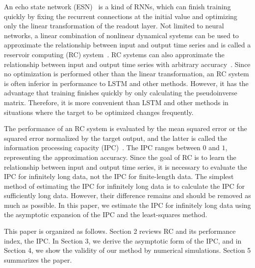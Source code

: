 \documentclass{article}
\begin{document}
An echo state network (ESN)~\cite{jaeger2004harnessing} is a kind of RNNs, which can finish training quickly by fixing the recurrent connections at the initial value and optimizing only the linear transformation of the readout layer. 
Not limited to neural networks, a linear combination of nonlinear dynamical systems can be used to approximate the relationship between input and output time series and is called a reservoir computing (RC) system~\cite{tanaka2019recent}. 
RC systems can also approximate the relationship between input and output time series with arbitrary accuracy~\cite{grigoryeva2018echo, gonon2019reservoir}. 
Since no optimization is performed other than the linear transformation, an RC system is often inferior in performance to LSTM and other methods. 
However, it has the advantage that training finishes quickly by only calculating the pseudoinverse matrix. 
Therefore, it is more convenient than LSTM and other methods in situations where the target to be optimized changes frequently. 

The performance of an RC system is evaluated by the mean squared error or the squared error normalized by the target output, and the latter is called the information processing capacity (IPC)~\cite{dambre2012information, kubota2021unifying}. 
The IPC ranges between $0$ and $1$, representing the approximation accuracy. 
Since the goal of RC is to learn the relationship between input and output time series, it is necessary to evaluate the IPC for infinitely long data, not the IPC for finite-length data. 
The simplest method of estimating the IPC for infinitely long data is to calculate the IPC for sufficiently long data. 
However, their difference remains and should be removed as much as possible. 
In this paper, we estimate the IPC for infinitely long data using the asymptotic expansion of the IPC and the least-squares method. 

This paper is organized as follows. 
Section 2 reviews RC and its performance index, the IPC. 
In Section 3, we derive the asymptotic form of the IPC, and in Section 4, we show the validity of our method by numerical simulations. 
Section 5 summarizes the paper. 
\end{document}
